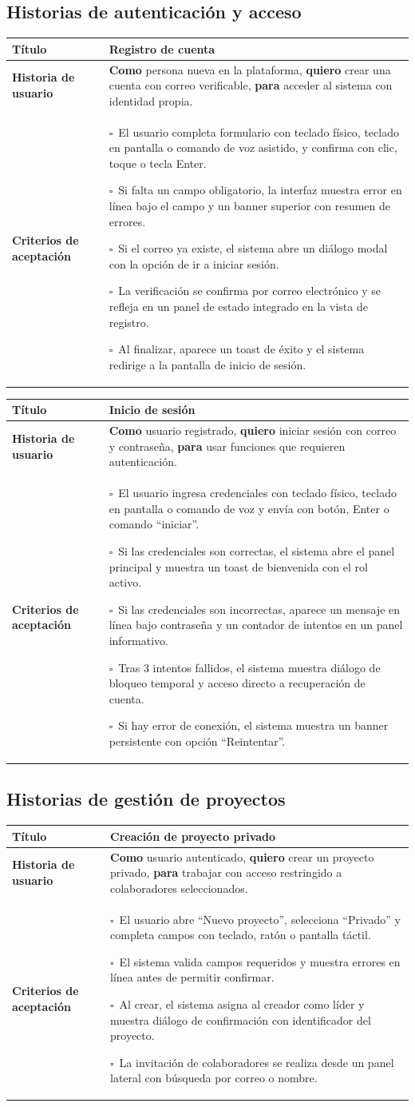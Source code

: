 \documentclass[12pt, letterpaper]{article}
\newcommand{\storycheck}[1]{\(\square\)~#1\par}
\newcommand{\story}[3]{%
\begin{table}[H]
    \centering
    \begingroup
    \arrayrulecolor{storyline}
    \setlength{\tabcolsep}{10pt}
    \renewcommand{\arraystretch}{1.55}
    \begin{tabularx}{\textwidth}{|>{\raggedright\arraybackslash\bfseries\columncolor{storyheaderbg}}p{3.4cm}|>{\raggedright\arraybackslash\columncolor{storycontentbg}}X|}
        \hline
        Título & #1 \\
        \hline
        Historia de usuario & #2 \\
        \hline
        Criterios de aceptación & #3 \\
        \hline
    \end{tabularx}
    \endgroup
\end{table}
}
\begin{document}
\subsection{Historias de autenticación y acceso}

\story
{Registro de cuenta}
{\textbf{Como} persona nueva en la plataforma, \textbf{quiero} crear una cuenta con correo verificable, \textbf{para} acceder al sistema con identidad propia.}
{%
\storycheck{El usuario completa formulario con teclado físico, teclado en pantalla o comando de voz asistido, y confirma con clic, toque o tecla Enter.}
\storycheck{Si falta un campo obligatorio, la interfaz muestra error en línea bajo el campo y un banner superior con resumen de errores.}
\storycheck{Si el correo ya existe, el sistema abre un diálogo modal con la opción de ir a iniciar sesión.}
\storycheck{La verificación se confirma por correo electrónico y se refleja en un panel de estado integrado en la vista de registro.}
\storycheck{Al finalizar, aparece un toast de éxito y el sistema redirige a la pantalla de inicio de sesión.}}

\story
{Inicio de sesión}
{\textbf{Como} usuario registrado, \textbf{quiero} iniciar sesión con correo y contraseña, \textbf{para} usar funciones que requieren autenticación.}
{%
\storycheck{El usuario ingresa credenciales con teclado físico, teclado en pantalla o comando de voz y envía con botón, Enter o comando ``iniciar''.}
\storycheck{Si las credenciales son correctas, el sistema abre el panel principal y muestra un toast de bienvenida con el rol activo.}
\storycheck{Si las credenciales son incorrectas, aparece un mensaje en línea bajo contraseña y un contador de intentos en un panel informativo.}
\storycheck{Tras 3 intentos fallidos, el sistema muestra diálogo de bloqueo temporal y acceso directo a recuperación de cuenta.}
\storycheck{Si hay error de conexión, el sistema muestra un banner persistente con opción ``Reintentar''.}}

\subsection{Historias de gestión de proyectos}

\story
{Creación de proyecto privado}
{\textbf{Como} usuario autenticado, \textbf{quiero} crear un proyecto privado, \textbf{para} trabajar con acceso restringido a colaboradores seleccionados.}
{%
\storycheck{El usuario abre ``Nuevo proyecto'', selecciona ``Privado'' y completa campos con teclado, ratón o pantalla táctil.}
\storycheck{El sistema valida campos requeridos y muestra errores en línea antes de permitir confirmar.}
\storycheck{Al crear, el sistema asigna al creador como líder y muestra diálogo de confirmación con identificador del proyecto.}
\storycheck{La invitación de colaboradores se realiza desde un panel lateral con búsqueda por correo o nombre.}}
\end{document}
